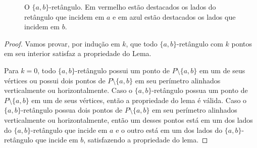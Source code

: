 \begin{figure}
    \caption{O $\{a,b\}$-retângulo. Em vermelho estão destacados os lados do retângulo que incidem em $a$ e em azul estão destacados os lados que incidem em $b$.}
\end{figure}

\begin{proof}

    Vamos provar, por indução em $k$, que todo $\{a,b\}$-retângulo com $k$ pontos em seu interior satisfaz a propriedade do Lema.

    Para $k = 0$, todo $\{a,b\}$-retângulo possui um ponto de $P \setminus \{a,b\}$ em um de seus vértices ou possui dois pontos de $P \setminus \{a,b\}$ em seu perímetro alinhados verticalmente ou horizontalmente. Caso o $\{a,b\}$-retângulo possua um ponto de $P \setminus \{a,b\}$ em um de seus vértices, então a propriedade do lema é válida. Caso o $\{a,b\}$-retângulo possua dois pontos de $P \setminus \{a,b\}$ em seu perímetro alinhados verticalmente ou horizontalmente, então um desses pontos está em um dos lados do $\{a,b\}$-retângulo que incide em $a$ e o outro está em um dos lados do $\{a,b\}$-retângulo que incide em $b$, satisfazendo a propriedade do lema.


\end{proof}
